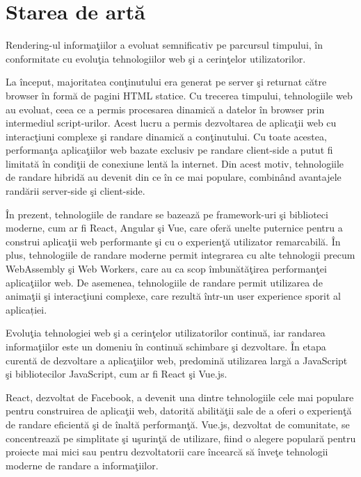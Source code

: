 \documentclass[12pt, a4paper]{report}
\begin{document}
\section{Starea de art\u a}

Rendering-ul informa\c tiilor a evoluat semnificativ pe parcursul timpului, \^ in conformitate cu evolu\c tia tehnologiilor web \c si a cerin\c telor utilizatorilor.

La \^ inceput, majoritatea con\c tinutului era generat pe server \c si returnat c\u atre browser \^ in form\u a de pagini HTML statice. Cu trecerea timpului, tehnologiile web au evoluat, ceea ce a permis procesarea dinamic\u a a datelor în browser prin intermediul script-urilor. Acest lucru a permis dezvoltarea de aplica\c tii web cu interac\c tiuni complexe \c si randare dinamic\u a a con\c tinutului. Cu toate acestea, performan\c ta aplica\c tiilor web bazate exclusiv pe randare client-side a putut fi limitat\u a \^ in condi\c tii de conexiune lent\u a la internet. Din acest motiv, tehnologiile de randare hibrid\u a au devenit din ce \^ in ce mai populare, combin\^ and avantajele rand\u arii server-side \c si client-side. \cite{html}

\^ In prezent, tehnologiile de randare se bazeaz\u a pe framework-uri \c si biblioteci moderne, cum ar fi React, Angular \c si Vue, care ofer\u a unelte puternice pentru a construi aplica\c tii web performante \c si cu o experien\c t\u a utilizator remarcabil\u a. \^ In plus, tehnologiile de randare moderne permit integrarea cu alte tehnologii precum WebAssembly \c si Web Workers, care au ca scop \^ imbun\u at\u a\c tirea performan\c tei aplica\c tiilor web. De asemenea, tehnologiile de randare permit utilizarea de anima\c tii \c si interac\c tiuni complexe, care rezultă într-un user experience sporit al aplicației.

Evolu\c tia tehnologiei web \c si a cerin\c telor utilizatorilor continu\u a, iar randarea informa\c tiilor este un domeniu \^ in continu\u a schimbare \c si dezvoltare. \^ In etapa curent\u a de dezvoltare a aplica\c tiilor web, predomin\u a utilizarea larg\u a a JavaScript \c si bibliotecilor JavaScript, cum ar fi React \c si Vue.js.

React, dezvoltat de Facebook, a devenit una dintre tehnologiile cele mai populare pentru construirea de aplica\c tii web, datorit\u a abilit\u a\c tii sale de a oferi o experien\c t\u a de randare eficient\u a \c si de \^ inalt\u a performan\c t\u a. Vue.js, dezvoltat de comunitate, se concentreaz\u a pe simplitate \c si u\c surin\c t\u a de utilizare, fiind o alegere popular\u a pentru proiecte mai mici sau pentru dezvoltatorii care \^ incearc\u a s\u a \^ inve\c te tehnologii moderne de randare a informa\c tiilor.
\end{document}

